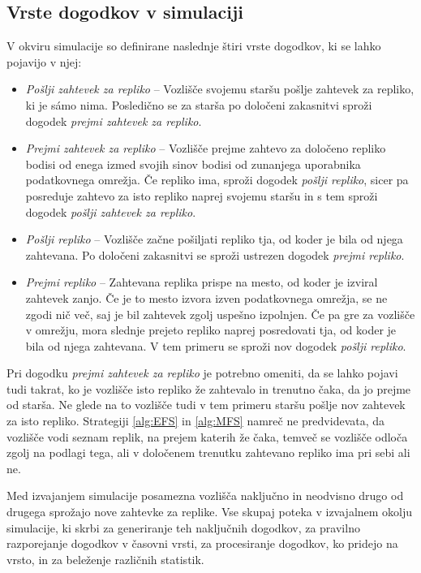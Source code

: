 \documentclass[a4paper, 12pt]{book}
\begin{document}
\subsection{Vrste dogodkov v simulaciji}
V okviru simulacije so definirane naslednje štiri vrste dogodkov, ki se lahko
pojavijo v njej:
\begin{itemize}
  \item \textit{Pošlji zahtevek za repliko} -- Vozlišče svojemu staršu pošlje
  zahtevek za repliko, ki je sámo nima. Posledično se za starša po določeni
  zakasnitvi sproži dogodek \textit{prejmi zahtevek za repliko}.

  \item \textit{Prejmi zahtevek za repliko} -- Vozlišče prejme zahtevo za
  določeno repliko bodisi od enega izmed svojih sinov bodisi od zunanjega
  uporabnika podatkovnega omrežja. Če repliko ima, sproži dogodek
  \textit{pošlji repliko}, sicer pa posreduje zahtevo za isto repliko
  naprej svojemu staršu in s tem sproži dogodek \textit{pošlji zahtevek za
  repliko}.

  \item \textit{Pošlji repliko} -- Vozlišče začne pošiljati repliko tja, od
  koder je bila od njega zahtevana. Po določeni zakasnitvi se sproži ustrezen
  dogodek \textit{prejmi repliko}.

  \item \textit{Prejmi repliko} -- Zahtevana replika prispe na mesto, od
  koder je izviral zahtevek zanjo. Če je to mesto izvora izven podatkovnega
  omrežja, se ne zgodi nič več, saj je bil zahtevek zgolj uspešno izpolnjen.
  Če pa gre za vozlišče v omrežju, mora slednje prejeto repliko naprej
  posredovati tja, od koder je bila od njega zahtevana. V tem primeru se
  sproži nov dogodek \textit{pošlji repliko}.
\end{itemize}

Pri dogodku \textit{prejmi zahtevek za repliko} je potrebno omeniti, da se
lahko pojavi tudi takrat, ko je vozlišče isto repliko že zahtevalo in trenutno
čaka, da jo prejme od starša. Ne glede na to vozlišče tudi v tem primeru staršu
pošlje nov zahtevek za isto repliko. Strategiji \ref{alg:EFS} in \ref{alg:MFS}
namreč ne predvidevata, da vozlišče vodi seznam replik, na prejem katerih
že čaka, temveč se vozlišče odloča zgolj na podlagi tega, ali v določenem
trenutku zahtevano repliko ima pri sebi ali ne.

Med izvajanjem simulacije posamezna vozlišča naključno in neodvisno drugo od
drugega sprožajo nove zahtevke za replike. Vse skupaj poteka v izvajalnem
okolju simulacije, ki skrbi za generiranje teh naključnih dogodkov, za
pravilno razporejanje dogodkov v časovni vrsti, za procesiranje dogodkov,
ko pridejo na vrsto, in za beleženje različnih statistik.
\end{document}
